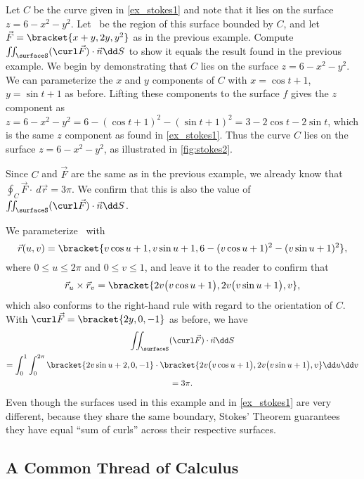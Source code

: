 \begin{example}\label{ex_stokes2}
Let $C$ be the curve given in \autoref{ex_stokes1} and note that it lies on the surface $z = 6-x^2-y^2$. Let \surfaceS\ be the region of this surface bounded by $C$, and let $\vec F =\bracket{x+y,2y,y^2}$ as in the previous example. Compute $\iint_\surfaceS (\curl\vec F)\cdot \vec n\dd S $ to show it equals the result found in the previous example.
\solution
We begin by demonstrating that $C$ lies on the surface $z=6-x^2-y^2$. We can parameterize the $x$ and $y$ components of $C$ with $x=\cos t+1$, $y=\sin t+1$ as before. Lifting these components to the surface $f$ gives the $z$ component as $z = 6-x^2-y^2 = 6-(\cos t+1)^2-(\sin t+1)^2 = 3-2\cos t-2\sin t$, which is the same $z$ component as found in \autoref{ex_stokes1}. Thus the curve $C$ lies on the surface $z=6-x^2-y^2$, as illustrated in \autoref{fig:stokes2}. 

Since $C$ and $\vec F$ are the same as in the previous example, we already know that $\oint_C\vec F\cdot\ d\vec r = 3\pi$. We confirm that this is also the value of $\iint_\surfaceS (\curl\vec F)\cdot \vec n\dd S$.

We parameterize \surfaceS\ with
\[\vec r(u,v) =\bracket{v\cos u+1,v\sin u+1, 6-(v\cos u+1)^2-(v\sin u+1)^2},\]
where $0\leq u\leq 2\pi$ and $0\leq v\leq 1$, and leave it to the reader to confirm that
\[
\vec r_u\times \vec r_v =\bracket{2v\bigl(v\cos u+1\bigr), 2v\bigl(v\sin u+1\bigr),v},
\]
which also conforms to the right-hand rule with regard to the orientation of $C$. With $\curl \vec F =\bracket{2y,0,-1}$ as before, we have
\begin{multline*}
	\iint_\surfaceS (\curl\vec F)\cdot \vec n\dd S\\ 
	=\int_0^1\int_0^{2\pi}\bracket{2v\sin u+2,0,-1}\cdot\bracket{2v\bigl(v\cos u+1\bigr), 2v\bigl(v\sin u+1\bigr),v}\dd u\dd v\\
	=3\pi.
\end{multline*}
Even though the  surfaces used in this example and in \autoref{ex_stokes1} are very different, because they share the same boundary, Stokes' Theorem guarantees they have equal ``sum of curls'' across their respective surfaces.
\end{example}

\subsection{A Common Thread of Calculus}

